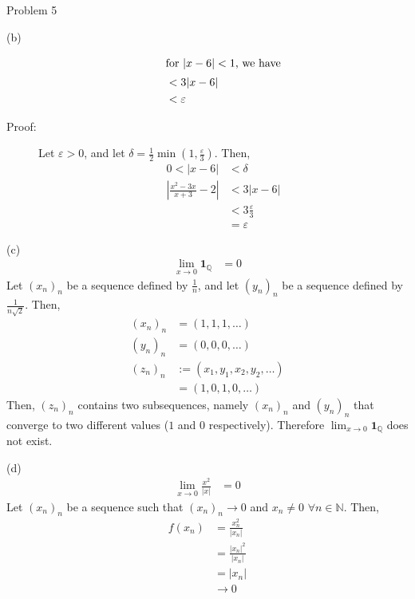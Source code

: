 \documentclass[10pt]{extarticle}
\renewcommand{\mathbf}[1]{\mathbold{#1}}
\newcommand{\N}{\mathbb{N}}
\newcommand{\Q}{\mathbb{Q}}
\begin{document}
\begin{problem}{Problem 5}
\begin{problem}{(b)}
\begin{description}
\begin{align*}
                                                \shortintertext{for $|x-6| < 1$, we have}
                                                &< 3|x-6|\\
                                                &< \varepsilon
          \end{align*}
        \item[Proof:] Let $\varepsilon > 0$, and let $\delta = \frac{1}{2}\min\left(1,\frac{\varepsilon}{3}\right)$. Then,
          \begin{align*}
            0 < |x-6| &< \delta\\
            \left|\frac{x^2-3x}{x+3} - 2\right| &< 3|x-6|\\
                                                &< 3\frac{\varepsilon}{3}\\
                                                &= \varepsilon
          \end{align*}
      \end{description}
    \end{problem}
    \begin{problem}{(c)}
      \begin{align*}
        \lim_{x\rightarrow 0}\mathbf{1}_{\Q} &= 0
      \end{align*}
      \tcblower
      Let $(x_n)_n$ be a sequence defined by $\frac{1}{n}$, and let $(y_n)_n$ be a sequence defined by $\frac{1}{n\sqrt{2}}$. Then,
      \begin{align*}
        (x_n)_n &= (1,1,1,\dots)\\
        (y_n)_n &= (0,0,0,\dots)\\
        (z_n)_n &:= (x_1,y_1,x_2,y_2,\dots)\\
                &= (1,0,1,0,\dots)
      \end{align*}
      Then, $(z_n)_n$ contains two subsequences, namely $(x_n)_n$ and $(y_n)_n$ that converge to two different values ($1$ and $0$ respectively). Therefore $\lim_{x\rightarrow 0}\mathbf{1}_{\Q}$ does not exist.
    \end{problem}
    \begin{problem}{(d)}
      \begin{align*}
        \lim_{x\rightarrow 0}\frac{x^2}{|x|} &= 0
      \end{align*}
      \tcblower
      Let $(x_n)_n$ be a sequence such that $(x_n)_n \rightarrow 0$ and $x_n\neq 0$ $\forall n\in\N$. Then,
      \begin{align*}
        f(x_n) &= \frac{x_n^2}{|x_n|}\\
               &= \frac{|x_n|^2}{|x_n|}\\
               &= |x_n|\\
               &\rightarrow 0
      \end{align*}
    \end{problem}
  \end{problem}
\end{document}
